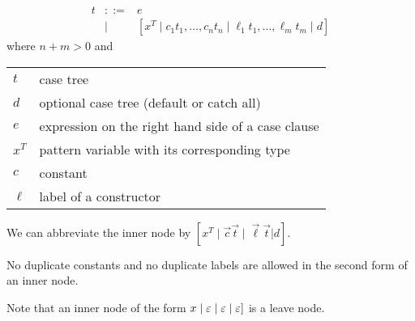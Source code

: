 $$
    \begin{array}{lllll}
        t
        &::=& e
        \\
        &\mid& [
            x^T
            \mid
            c_1 t_1, \ldots,  c_n t_n \mid
            \ell_1 t_1, \ldots, \ell_m t_m
            \mid
            d
        ]
    \end{array}
$$
%
where $n + m > 0$ and
%
\begin{center}
    \begin{tabular}{l p{8cm}}
        $t$ & case tree
        \\
        $d$ & optional case tree (default or catch all)
        \\
        $e$ & expression on the right hand side of a case clause
        \\
        $x^T$ & pattern variable with its corresponding type
        \\
        $c$ & constant
        \\
        $\ell$ & label of a constructor
    \end{tabular}
\end{center}

We can abbreviate the inner node by $[x^T \mid \vec c\vec t \mid
\vec\ell \vec t | d]$.


No duplicate constants and no duplicate labels are allowed in the second form of
an inner node.

Note that an inner node of the form $x \mid \varepsilon \mid \varepsilon \mid \varepsilon]$ is
a leave node.

